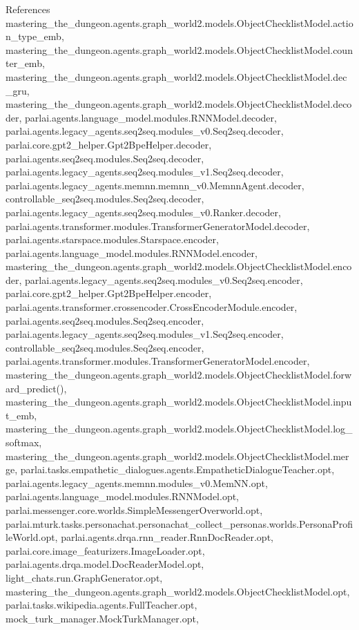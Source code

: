 References mastering\+\_\+the\+\_\+dungeon.\+agents.\+graph\+\_\+world2.\+models.\+Object\+Checklist\+Model.\+action\+\_\+type\+\_\+emb, mastering\+\_\+the\+\_\+dungeon.\+agents.\+graph\+\_\+world2.\+models.\+Object\+Checklist\+Model.\+counter\+\_\+emb, mastering\+\_\+the\+\_\+dungeon.\+agents.\+graph\+\_\+world2.\+models.\+Object\+Checklist\+Model.\+dec\+\_\+gru, mastering\+\_\+the\+\_\+dungeon.\+agents.\+graph\+\_\+world2.\+models.\+Object\+Checklist\+Model.\+decoder, parlai.\+agents.\+language\+\_\+model.\+modules.\+R\+N\+N\+Model.\+decoder, parlai.\+agents.\+legacy\+\_\+agents.\+seq2seq.\+modules\+\_\+v0.\+Seq2seq.\+decoder, parlai.\+core.\+gpt2\+\_\+helper.\+Gpt2\+Bpe\+Helper.\+decoder, parlai.\+agents.\+seq2seq.\+modules.\+Seq2seq.\+decoder, parlai.\+agents.\+legacy\+\_\+agents.\+seq2seq.\+modules\+\_\+v1.\+Seq2seq.\+decoder, parlai.\+agents.\+legacy\+\_\+agents.\+memnn.\+memnn\+\_\+v0.\+Memnn\+Agent.\+decoder, controllable\+\_\+seq2seq.\+modules.\+Seq2seq.\+decoder, parlai.\+agents.\+legacy\+\_\+agents.\+seq2seq.\+modules\+\_\+v0.\+Ranker.\+decoder, parlai.\+agents.\+transformer.\+modules.\+Transformer\+Generator\+Model.\+decoder, parlai.\+agents.\+starspace.\+modules.\+Starspace.\+encoder, parlai.\+agents.\+language\+\_\+model.\+modules.\+R\+N\+N\+Model.\+encoder, mastering\+\_\+the\+\_\+dungeon.\+agents.\+graph\+\_\+world2.\+models.\+Object\+Checklist\+Model.\+encoder, parlai.\+agents.\+legacy\+\_\+agents.\+seq2seq.\+modules\+\_\+v0.\+Seq2seq.\+encoder, parlai.\+core.\+gpt2\+\_\+helper.\+Gpt2\+Bpe\+Helper.\+encoder, parlai.\+agents.\+transformer.\+crossencoder.\+Cross\+Encoder\+Module.\+encoder, parlai.\+agents.\+seq2seq.\+modules.\+Seq2seq.\+encoder, parlai.\+agents.\+legacy\+\_\+agents.\+seq2seq.\+modules\+\_\+v1.\+Seq2seq.\+encoder, controllable\+\_\+seq2seq.\+modules.\+Seq2seq.\+encoder, parlai.\+agents.\+transformer.\+modules.\+Transformer\+Generator\+Model.\+encoder, mastering\+\_\+the\+\_\+dungeon.\+agents.\+graph\+\_\+world2.\+models.\+Object\+Checklist\+Model.\+forward\+\_\+predict(), mastering\+\_\+the\+\_\+dungeon.\+agents.\+graph\+\_\+world2.\+models.\+Object\+Checklist\+Model.\+input\+\_\+emb, mastering\+\_\+the\+\_\+dungeon.\+agents.\+graph\+\_\+world2.\+models.\+Object\+Checklist\+Model.\+log\+\_\+softmax, mastering\+\_\+the\+\_\+dungeon.\+agents.\+graph\+\_\+world2.\+models.\+Object\+Checklist\+Model.\+merge, parlai.\+tasks.\+empathetic\+\_\+dialogues.\+agents.\+Empathetic\+Dialogue\+Teacher.\+opt, parlai.\+agents.\+legacy\+\_\+agents.\+memnn.\+modules\+\_\+v0.\+Mem\+N\+N.\+opt, parlai.\+agents.\+language\+\_\+model.\+modules.\+R\+N\+N\+Model.\+opt, parlai.\+messenger.\+core.\+worlds.\+Simple\+Messenger\+Overworld.\+opt, parlai.\+mturk.\+tasks.\+personachat.\+personachat\+\_\+collect\+\_\+personas.\+worlds.\+Persona\+Profile\+World.\+opt, parlai.\+agents.\+drqa.\+rnn\+\_\+reader.\+Rnn\+Doc\+Reader.\+opt, parlai.\+core.\+image\+\_\+featurizers.\+Image\+Loader.\+opt, parlai.\+agents.\+drqa.\+model.\+Doc\+Reader\+Model.\+opt, light\+\_\+chats.\+run.\+Graph\+Generator.\+opt, mastering\+\_\+the\+\_\+dungeon.\+agents.\+graph\+\_\+world2.\+models.\+Object\+Checklist\+Model.\+opt, parlai.\+tasks.\+wikipedia.\+agents.\+Full\+Teacher.\+opt, mock\+\_\+turk\+\_\+manager.\+Mock\+Turk\+Manager.\+opt, 